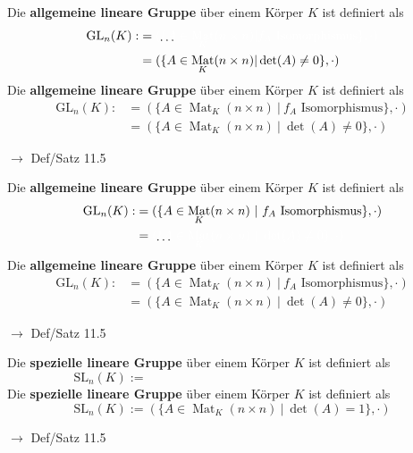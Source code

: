 \documentclass[11pt]{article}
\renewcommand{\cite}[1]{\par\bigskip\hfill{\color{gray}\tiny\(\to\) #1}}
\DeclareMathOperator{\Mat}{Mat}
\newcommand{\hide}[1]{\parbox{0cm}{\raisebox{-7pt}[0cm]{\dots}}\color{white}#1\color{black}}
\let\olddots\dots
\renewcommand{\dots}{\,\olddots\,}
\newenvironment{field}{}{\newpage}
\newif\ifnote
\newenvironment{note}{\notetrue}{\notefalse}
\newcommand{\localtag}{}
\newcommand{\globaltag}{}
\newcommand{\uuid}{}
\newcommand{\tags}[1]{
    \ifnote
        \renewcommand{\localtag}{#1}
    \else
        \renewcommand{\globaltag}{#1}
    \fi
    }
\newcommand{\xplain}[1]{\renewcommand{\uuid}{#1}}
\begin{document}
\begin{note}
    \tags{Def Satz}
    \xplain{91122bd6-c30d-11ec-9d64-0242ac120002}
    \begin{field} %
        Die \textbf{allgemeine lineare Gruppe} über einem Körper \(K\) ist definiert als
        \begin{align*}
            \text{GL}_n(K) :&= \hide{(\{A\in\Mat_K(n \times n) \vert f_A \text{ Isomorphismus} \}, \cdot)}\\
            &= (\{A\in\Mat_K(n \times n) \vert \det(A) \neq 0 \}, \cdot)
        \end{align*}
    \end{field}
    \begin{field}
        Die \textbf{allgemeine lineare Gruppe} über einem Körper \(K\) ist definiert als
        \begin{align*}
            \text{GL}_n(K) :&= (\{A\in\Mat_K(n \times n) \ \vert \ f_A \text{ Isomorphismus} \}, \cdot)\\
            &= (\{A\in\Mat_K(n \times n) \ \vert \ \det(A) \neq 0 \}, \cdot)
        \end{align*}
        \cite{Def/Satz 11.5}
    \end{field}

    \begin{field} %
        Die \textbf{allgemeine lineare Gruppe} über einem Körper \(K\) ist definiert als
        \begin{align*}
            \text{GL}_n(K) :&= (\{A\in\Mat_K(n \times n) \ \vert \  f_A \text{ Isomorphismus} \}, \cdot)\\
            &= \hide{(\{A\in\Mat_K(n \times n) \ \vert \ \det(A) \neq 0 \}, \cdot)}
        \end{align*}
    \end{field}
    \begin{field}
        Die \textbf{allgemeine lineare Gruppe} über einem Körper \(K\) ist definiert als
        \begin{align*}
            \text{GL}_n(K) :&= (\{A\in\Mat_K(n \times n) \ \vert \  f_A \text{ Isomorphismus} \}, \cdot)\\
            &= (\{A\in\Mat_K(n \times n) \ \vert \  \det(A) \neq 0 \}, \cdot)
        \end{align*}
        \cite{Def/Satz 11.5}
    \end{field}

    \begin{field} %
        Die \textbf{spezielle lineare Gruppe} über einem Körper \(K\) ist definiert als
        \[\text{SL}_n(K) := \phantom{(\{ A \in\Mat_K(n\times n)\ \vert \ \det(A) = 1\}, \cdot ) }\]
    \end{field}
    \begin{field}
        Die \textbf{spezielle lineare Gruppe} über einem Körper \(K\) ist definiert als
        \[\text{SL}_n(K) := (\{ A \in\Mat_K(n\times n)\ \vert \ \det(A) = 1\}, \cdot )\]
        \cite{Def/Satz 11.5}
    \end{field}
\end{note}
\end{document}
